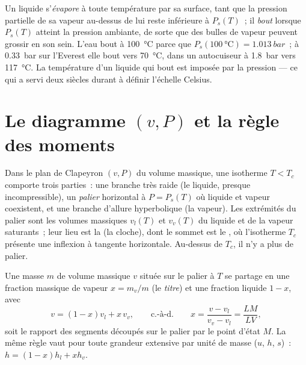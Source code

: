 \begin{remark}\label{rem:b1:phase-changes:boiling}
Un liquide s'\emph{évapore} à toute température par sa surface, tant que la
pression partielle de sa vapeur au-dessus de lui reste inférieure à $P_s(T)$~;
il \emph{bout} lorsque $P_s(T)$ atteint la pression ambiante, de sorte que
des bulles de vapeur peuvent grossir en son sein. L'eau bout à
\qty{100}{\degreeCelsius} parce que
$P_s(\qty{100}{\degreeCelsius}) = \qty{1.013}{bar}$~; à \qty{0.33}{bar} sur
l'Everest elle bout vers \qty{70}{\degreeCelsius}, dans un autocuiseur à
\qty{1.8}{bar} vers \qty{117}{\degreeCelsius}. La température d'un liquide qui
bout est imposée par la pression --- ce qui a servi deux siècles durant à
définir l'échelle Celsius.
\end{remark}

\section{Le diagramme $(v, P)$ et la règle des moments}

\begin{proposition}\label{prop:b1:phase-changes:andrews}
Dans le plan de Clapeyron $(v, P)$ du volume massique, une isotherme
$T < T_c$ comporte trois parties~: une branche très raide (le liquide,
presque incompressible), un \emph{palier} horizontal à $P = P_s(T)$ où
liquide et vapeur coexistent, et une branche d'allure hyperbolique (la
vapeur). Les extrémités du palier sont les volumes massiques $v_l(T)$ et
$v_v(T)$ du liquide et de la vapeur saturants~; leur lieu est la
\emph{} (la cloche), dont le sommet est le , où l'isotherme $T_c$ présente une inflexion à tangente
horizontale. Au-dessus de $T_c$, il n'y a plus de palier.
\end{proposition}
\admitted

\begin{theorem}\label{thm:b1:phase-changes:lever}
Une masse $m$ de volume massique $v$ située sur le palier à $T$ se partage en
une fraction massique de vapeur $x = m_v/m$ (le \emph{titre}) et une fraction
liquide $1 - x$, avec
\[
v = (1 - x)v_l + x\,v_v , \qquad\text{c.-à-d.}\qquad
x = \frac{v - v_l}{v_v - v_l} = \frac{LM}{LV} ,
\]
soit le rapport des segments découpés sur le palier par le point d'état $M$.
La même règle vaut pour toute grandeur extensive par unité de masse ($u$,
$h$, $s$)~: $h = (1 - x)h_l + xh_v$.
\end{theorem}

